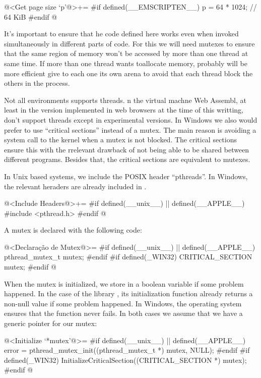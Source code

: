 \iniciocodigo
@<Get page size `p'@>+=
#if defined(__EMSCRIPTEN__)
p = 64 * 1024; // 64 KiB
#endif
@
\fimcodigo


It's important to ensure that he code defined here works even when
invoked simultaneously in different parts of code. For this we will
need mutexes to ensure that the same region of memory won't be
accessed by more than one thread at same time. If more than one thread
wants toallocate memory, probably will be more efficient give to each
one its own arena to avoid that each thread block the others in the
process.

Not all environments supports threads. n the virtual machne Web
Assembl, at least in the version implemented in web browsers at the
time of this writting, don't support threads except in experimental
versions. In Windows we also would prefer to use ``critical sections''
instead of a mutex. The main reason is avoiding a system call to the
kernel when a mutex is not blocked. The critical sections ensure this
with the rrelevant drawback of not being able to be shared between
different programs. Besides that, the critical sections are equivalent
to mutexes.

In Unix based systems, we include the POSIX header ``pthreads''. In
Windows, the relevant heraders are already included in
.

\iniciocodigo
@<Include Headers@>+=
#if defined(__unix__) || defined(__APPLE__)
#include <pthread.h>
#endif
@
\fimcodigo

A mutex is declared with the following code:

\iniciocodigo
@<Declaração de Mutex@>=
#if defined(__unix__) || defined(__APPLE__)
pthread_mutex_t mutex;
#endif
#if defined(_WIN32)
CRITICAL_SECTION mutex;
#endif
@
\fimcodigo

When the mutex is initialized, we store in a boolean
variable  if some problem happened. In the case of
the library , its initialization function already
returns a non-null value if some problem happened. In Windows, the
operating system ensures that the function never fails. In both cases
we assume that we have a generic pointer for our mutex:

\iniciocodigo
@<Initialize `*mutex'@>=
#if defined(__unix__) || defined(__APPLE__)
error = pthread_mutex_init((pthread_mutex_t *) mutex, NULL);
#endif
#if defined(_WIN32)
InitializeCriticalSection((CRITICAL_SECTION *) mutex);
#endif
@
\fimcodigo

